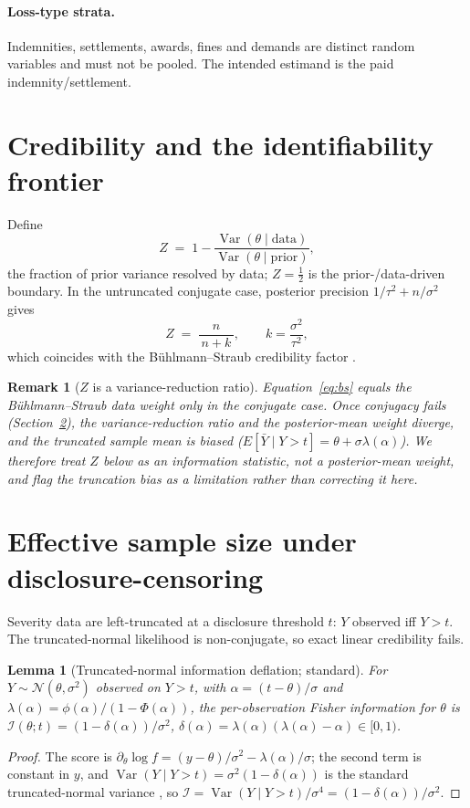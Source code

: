 \documentclass[11pt]{article}
\newtheorem{lemma}{Lemma}
\newtheorem{remark}{Remark}
\DeclareMathOperator{\Var}{Var}
\begin{document}
\paragraph{Loss-type strata.} Indemnities, settlements, awards, fines and demands are distinct
random variables and must not be pooled. The intended estimand is the paid indemnity/settlement.

\section{Credibility and the identifiability frontier}\label{sec:frontier}
Define
\begin{equation}
Z \;=\; 1-\frac{\Var(\theta\mid \text{data})}{\Var(\theta\mid \text{prior})},
\end{equation}
the fraction of prior variance resolved by data; $Z=\tfrac12$ is the prior-/data-driven boundary.
In the untruncated conjugate case, posterior precision $1/\tau^2+n/\sigma^2$ gives
\begin{equation}
Z \;=\; \frac{n}{\,n+k\,},\qquad k=\frac{\sigma^2}{\tau^2},
\label{eq:bs}
\end{equation}
which coincides with the B\"uhlmann--Straub credibility factor \citep{jewell1974,buhlmann2005}.
\begin{remark}[$Z$ is a variance-reduction ratio]\label{rem:Z}
Equation~\eqref{eq:bs} equals the B\"uhlmann--Straub \emph{data weight} only in the conjugate
case. Once conjugacy fails (Section~\ref{sec:trunc}), the variance-reduction ratio and the
posterior-mean weight diverge, and the truncated sample mean is biased
($E[\bar Y\mid Y>t]=\theta+\sigma\lambda(\alpha)$). We therefore treat $Z$ below as an
\emph{information} statistic, not a posterior-mean weight, and flag the truncation bias as a
limitation rather than correcting it here.
\end{remark}

\section{Effective sample size under disclosure-censoring}\label{sec:trunc}
Severity data are left-truncated at a disclosure threshold $t$: $Y$ observed iff $Y>t$. The
truncated-normal likelihood is non-conjugate, so exact linear credibility fails.

\begin{lemma}[Truncated-normal information deflation; standard]\label{lem:main}
For $Y\sim\mathcal{N}(\theta,\sigma^2)$ observed on $Y>t$, with $\alpha=(t-\theta)/\sigma$ and
$\lambda(\alpha)=\phi(\alpha)/(1-\Phi(\alpha))$, the per-observation Fisher information for
$\theta$ is $\mathcal{I}(\theta;t)=(1-\delta(\alpha))/\sigma^2$,
$\delta(\alpha)=\lambda(\alpha)(\lambda(\alpha)-\alpha)\in[0,1)$.
\end{lemma}
\begin{proof}[Proof]
The score is $\partial_\theta\log f=(y-\theta)/\sigma^2-\lambda(\alpha)/\sigma$; the second term
is constant in $y$, and $\Var(Y\mid Y>t)=\sigma^2(1-\delta(\alpha))$ is the standard
truncated-normal variance \citep{klugman2019}, so
$\mathcal{I}=\Var(Y\mid Y>t)/\sigma^4=(1-\delta(\alpha))/\sigma^2$.
\end{proof}
\end{document}
